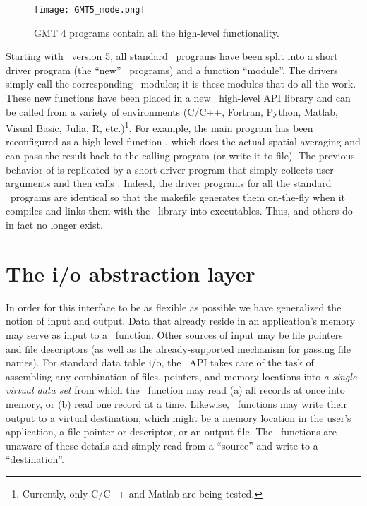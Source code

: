 \documentclass[11pt]{report}
\begin{document}
\begin{figure}[h]
	\centering
	\texttt{[image: GMT5\_mode.png]}
	\caption{GMT 4 programs contain all the high-level functionality.}
\end{figure}
Starting with \GMT\ version 5, all standard \GMT\ programs have been split into a short driver
program (the ``new'' \GMT\  programs) and a function ``module''.  The drivers simply call the corresponding \GMT\ modules;
it is these modules that do all the work.  These new functions have been placed
in a new \GMT\ high-level API library and can be called from a variety of environments
(C/C++, Fortran, Python, Matlab, Visual Basic, Julia, R, etc.)\footnote{Currently, only C/C++ and Matlab are being tested.}.
For example, the main program
 has been reconfigured as a high-level function ,
which does the actual spatial averaging and can pass the result back to the calling program (or write it to file).
The previous behavior of  is replicated by a short driver program
that simply collects user arguments and then calls .  Indeed, the driver
programs for all the standard \GMT\ programs are identical so that the makefile generates them
on-the-fly when it compiles and links them with the \GMT\ library into executables.
Thus,  and others do in fact no longer exist.

\section{The i/o abstraction layer}

In order for this interface to be as flexible as possible we have generalized the notion of input
and output. Data that already reside in an application's memory may serve as
input to a \GMT\ function.  Other sources of input may be file pointers
and file descriptors (as well as the already-supported mechanism for passing file names).
For standard data table i/o, the \GMT\ API takes care of the task of assembling any combination
of files, pointers, and memory locations into \emph{a single virtual data set} from which the \GMT\
function may read (a) all records at once into memory, or (b) read one record at a time.
Likewise, \GMT\ functions may write their output to a virtual destination, which
might be a memory location in the user's application, a file pointer or descriptor, or
an output file.  The \GMT\ functions are unaware of these details and simply
read from a ``source'' and write to a ``destination''.
\end{document}
